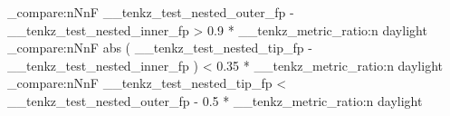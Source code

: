 \documentclass{standalone}
\begin{document}
\tenkzkernel
\begin{tenkz}[rows=1, cols=3, bonds=none]
  \tn[at=(1,1), skin=dot, name=r]{}
\end{tenkz}
\ExplSyntaxOn
\fp_compare:nNnF
  { \g__tenkz_test_nested_outer_fp - \g__tenkz_test_nested_inner_fp }
  >
  { 0.9 * \__tenkz_metric_ratio:n {daylight} }
  {  }
\fp_compare:nNnF
  {
    abs
      ( \g__tenkz_test_nested_tip_fp - \g__tenkz_test_nested_inner_fp )
  }
  < { 0.35 * \__tenkz_metric_ratio:n {daylight} }
  {  }
\fp_compare:nNnF
  { \g__tenkz_test_nested_tip_fp }
  <
  {
    \g__tenkz_test_nested_outer_fp
    - 0.5 * \__tenkz_metric_ratio:n {daylight}
  }
  {  }
\ExplSyntaxOff
\end{document}
